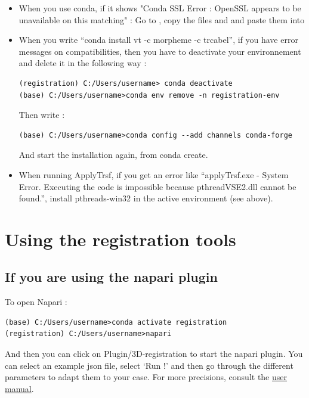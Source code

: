\documentclass[11pt]{article}
\begin{document}
\begin{itemize}
\paragraph{}Troubleshooting
\item[-]When you use conda, if it shows "Conda SSL Error : OpenSSL appears to be unavailable on this matching" : Go to ,
copy the files  and  and paste them into 
\item[-]When you write “conda install vt -c morpheme -c trcabel”, if you have error messages on compatibilities, then you have to deactivate your environnement and delete it in the following way :
\begin{verbatim}
(registration) C:/Users/username> conda deactivate
(base) C:/Users/username>conda env remove -n registration-env
\end{verbatim}
Then write :
\begin{verbatim}
(base) C:/Users/username>conda config --add channels conda-forge
 \end{verbatim}
And start the installation again, from conda create.
\item[-]When running ApplyTrsf, if you get an error like “applyTrsf.exe - System Error. Executing the code is impossible because pthreadVSE2.dll cannot be found.”, install pthreads-win32 in the active environment (see above).
\end{itemize}

\section{Using the registration tools}
\subsection{If you are using the napari plugin}
To open Napari :
\begin{verbatim}
(base) C:/Users/username>conda activate registration
(registration) C:/Users/username>napari
\end{verbatim}
And then you can click on Plugin/3D-registration to start the napari plugin. 
You can select an example json file, select ‘Run !’  and then go through the different parameters to adapt them to your case.
For more precisions, consult the \href{https://github.com/GuignardLab/napari-3D-registration}{user manual}.
\end{document}
